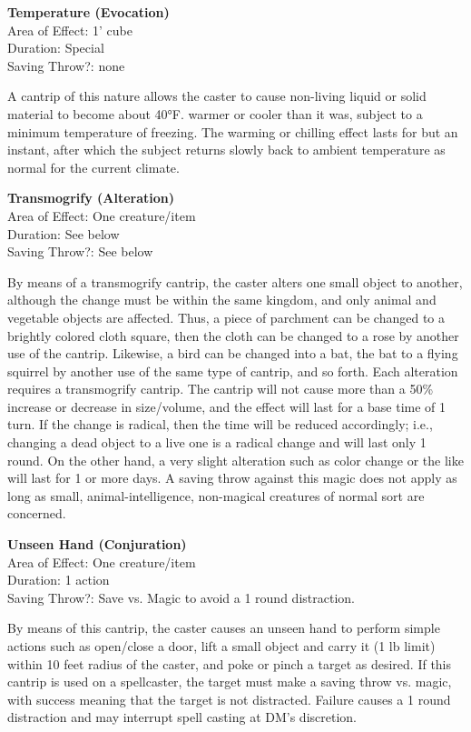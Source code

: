 \documentclass[letterpaper,sansserif,tightsqueeze]{rpg-module}
\begin{document}
\begin{samepage}	
\textbf{Temperature (Evocation)}\\
Area of Effect: 1' cube\\
Duration: Special\\
Saving Throw?: none

\nopagebreak
A cantrip of this nature allows the caster to cause non-living liquid or solid material to become about 40°F. warmer or cooler than it was, subject to a minimum temperature of freezing. The warming or chilling effect lasts for but an instant, after which the subject returns slowly back to ambient temperature as normal for the current climate.
\end{samepage}

\begin{samepage}	
\textbf{Transmogrify (Alteration)}\\
Area of Effect: One creature/item\\
Duration: See below\\
Saving Throw?: See below

\nopagebreak
By means of a transmogrify cantrip, the caster alters one small object to another, although the change must be within the same kingdom, and only animal and vegetable objects are affected. Thus, a piece of parchment can be changed to a brightly colored cloth square, then the cloth can be changed to a rose by another use of the cantrip. Likewise, a bird can be changed into a bat, the bat to a flying squirrel by another use of the same type of cantrip, and so forth. Each alteration requires a transmogrify cantrip. The cantrip will not cause more than a 50\% increase or decrease in size/volume, and the effect will last for a base time of 1 turn. If the change is radical, then the time will be reduced accordingly; i.e., changing a dead object to a live one is a radical change and will last only 1 round. On the other hand, a very slight alteration such as color change or the like will last for 1 or more days. A saving throw against this magic does not apply as long as small, animal-intelligence, non-magical creatures of normal sort are concerned.
\end{samepage}

\begin{samepage}	
\textbf{Unseen Hand (Conjuration)}\\
Area of Effect: One creature/item\\
Duration: 1 action\\
Saving Throw?: Save vs. Magic to avoid a 1 round distraction.

\nopagebreak
By means of this cantrip, the caster causes an unseen hand to perform simple actions such as open/close a door, lift a small object and carry it (1 lb limit) within 10 feet radius of the caster, and poke or pinch a target as desired.
If this cantrip is used on a spellcaster, the target must make a saving throw vs. magic, with success meaning that the target is not distracted. Failure causes a 1 round distraction and may interrupt spell casting at DM’s discretion.\\
\end{samepage}
\end{document}
